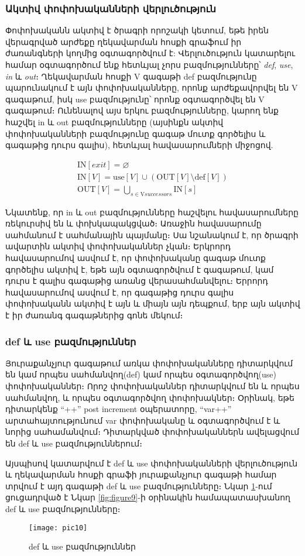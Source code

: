 {	\subsubsection{Ակտիվ փոփոխականների վերլուծություն}
	
	Փոփոխականն ակտիվ է ծրագրի որոշակի կետում, եթե իրեն վերագրված արժեքը ղեկավարման հոսքի գրաֆում իր ժառանգների կողմից օգտագործվում է:
	Վերլուծություն կատարելու համար օգտագործում ենք հետևյալ չորս բազմությունները՝ \textit{def}, \textit{use}, \textit{in} և \textit{out}։
	Ղեկավարման հոսքի V գագաթի def բազմությունը պարունակում է այն փոփոխականները, որոնք արժեքավորվել են V գագաթում,
	իսկ use բազմությունը՝ որոնք օգտագործվել են V գագաթում։ Ունենալով այս երկու բազմությունները, կարող ենք հաշվել in և out
	բազմությունները (այսինքն ակտիվ փոփոխականների բազմությունը գագաթ մուտք գործելիս և գագաթից դուրս գալիս),
	հետևյալ հավասարումների միջոցով\cite{aho}.
	
	{		
		\vspace{-\baselineskip}	
		\begin{align*}
			&\text{IN}[exit] = \varnothing & \\
			&\text{IN}[V] = \text{use}[V] \cup (\text{OUT}[V] \setminus \text{def}[V]) & \\
			&\text{OUT}[V] = \bigcup_{s \in \text{V}{successors}} \text{IN}[s] & 
		\end{align*}
	}

	Նկատենք, որ in և out բազմությունները հաշվելու հավասարումները ռեկուրսիվ են և փոխկապակցված։ Առաջին հավասարումը
	սահմանում է սահմանային պայմանը։ Սա նշանակում է, որ ծրագրի ավարտին ակտիվ փոփոխականներ չկան։ Երկրորդ հավասարումով
	ասվում է, որ փոփոխականը գագաթ մուտք գործելիս ակտիվ է, եթե այն օգտագործվում է գագաթում, կամ դուրս է գալիս գագաթից
	առանց վերասահմանվելու։ Երրորդ հավասարումով ասվում է, որ գագաթից դուրս գալիս փոփոխականն ակտիվ է այն և միայն այն
	դեպքում, երբ այն ակտիվ է իր ժառանգ գագաթներից գոնե մեկում։
	
	\subsubsection{def և use բազմություններ}
	Յուրաքանչյուր գագաթում առկա փոփոխականները դիտարկվում են կամ  որպես սահմանվող(def) կամ որպես օգտագործվող(use)
	փոփոխականներ։ Որոշ  փոփոխականներ դիտարկվում են և որպես սահմանվող, և որպես օգտագործվող փոփոխակներ։ Օրինակ, եթե
	դիտարկենք “++” post increment օպերատորը, “var++” արտահայտությունում var փոփոխականը և օգտագործվում է և նորից
	սահամանվում։ Դիտարկված փոփոխականներն ավելացվում են def և use բազմություններում։

	Այսպիսով կատարվում է def և use փոփոխականների վերլուծություն և ղեկավարման հոսքի գրաֆի յուրաքանչյուր գագաթի համար
	տրվում է այդ գագաթի def և use բազմությունները։ Նկար \ref{fig:figure10}-ում ցուցադրված է Նկար \ref{fig:figure9}-ի
	օրինակին համապատասխանող def և use բազմությունները։

	\begin{figure}[h]
		\centering
		\texttt{[image: pic10]}
		\caption{def և use բազմություններ}
		\label{fig:figure10}
	\end{figure}
	
}